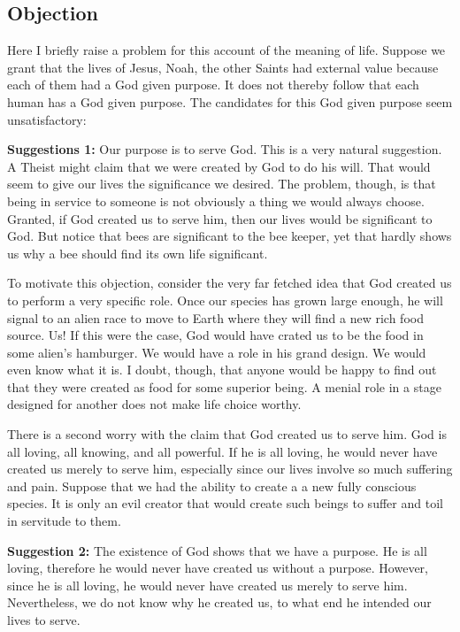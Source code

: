 \documentclass[]{article}
\begin{document}
\subsection{Objection}\label{objection}

Here I briefly raise a problem for this account of the meaning of life.
Suppose we grant that the lives of Jesus, Noah, the other Saints had
external value because each of them had a God given purpose. It does not
thereby follow that each human has a God given purpose. The candidates
for this God given purpose seem unsatisfactory:

\textbf{Suggestions 1:} Our purpose is to serve God. This is a very
natural suggestion. A Theist might claim that we were created by God to
do his will. That would seem to give our lives the significance we
desired. The problem, though, is that being in service to someone is not
obviously a thing we would always choose. Granted, if God created us to
serve him, then our lives would be significant to God. But notice that
bees are significant to the bee keeper, yet that hardly shows us why a
bee should find its own life significant.

To motivate this objection, consider the very far fetched idea that God
created us to perform a very specific role. Once our species has grown
large enough, he will signal to an alien race to move to Earth where
they will find a new rich food source. Us! If this were the case, God
would have crated us to be the food in some alien's hamburger. We would
have a role in his grand design. We would even know what it is. I doubt,
though, that anyone would be happy to find out that they were created as
food for some superior being. A menial role in a stage designed for
another does not make life choice worthy.

There is a second worry with the claim that God created us to serve him.
God is all loving, all knowing, and all powerful. If he is all loving,
he would never have created us merely to serve him, especially since our
lives involve so much suffering and pain. Suppose that we had the
ability to create a a new fully conscious species. It is only an evil
creator that would create such beings to suffer and toil in servitude to
them.

\textbf{Suggestion 2:} The existence of God shows that we have a
purpose. He is all loving, therefore he would never have created us
without a purpose. However, since he is all loving, he would never have
created us merely to serve him. Nevertheless, we do not know why he
created us, to what end he intended our lives to serve.
\end{document}
